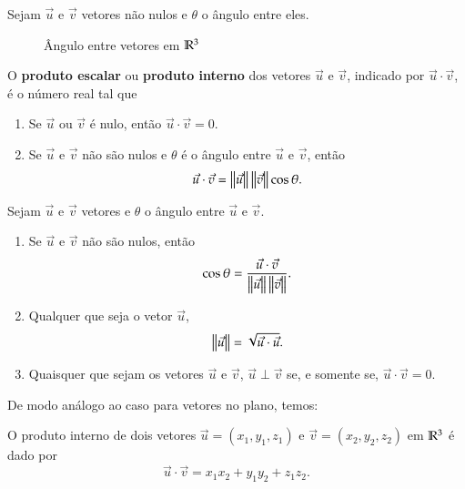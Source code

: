 Sejam $\vec{u}$ e $\vec{v}$ vetores n\~ao nulos e $\theta$ o \^angulo entre eles.
\begin{figure}[!h]
  \centering
  \caption{Ângulo entre vetores em $\mathbb{R}^3$}
\end{figure}


\begin{definicao}\label{produtointerno-espaco}
  O \textbf{produto escalar} ou \textbf{produto interno} dos vetores $\vec{u}$ e $\vec{v}$, indicado por $\vec{u}\cdot\vec{v}$, \'e o n\'umero real tal que
  \begin{enumerate}
    \item Se $\vec{u}$ ou $\vec{v}$ \'e nulo, ent\~ao $\vec{u}\cdot\vec{v} = 0$.
    \item Se $\vec{u}$ e $\vec{v}$ n\~ao s\~ao nulos e $\theta$ \'e o \^angulo entre $\vec{u}$ e $\vec{v}$, ent\~ao
    \begin{align}\label{produto-interno-espaco}
      \vec{u}\cdot\vec{v} = \left\Vert{\vec{u}}\right\Vert\left\Vert{\vec{v}}\right\Vert\cos\theta.
    \end{align}
  \end{enumerate}
\end{definicao}

\begin{proposicao}
  Sejam $\vec{u}$ e $\vec{v}$ vetores e $\theta$ o \^angulo entre $\vec{u}$ e $\vec{v}$.
  \begin{enumerate}
    \item Se $\vec{u}$ e $\vec{v}$ n\~ao s\~ao nulos, ent\~ao
    \[
      \cos\theta = \dfrac{\vec{u}\cdot\vec{v}}{\left\Vert{\vec{u}}\right\Vert\left\Vert{\vec{v}}\right\Vert}.
    \]
    \item Qualquer que seja o vetor $\vec{u}$,
    \[
      \left\Vert{\vec{u}}\right\Vert = \sqrt{\vec{u}\cdot\vec{u}}.
    \]
    \item Quaisquer que sejam os vetores $\vec{u}$ e $\vec{v}$, $\vec{u}\perp\vec{v}$ se, e somente se, $\vec{u}\cdot\vec{v} = 0$.
    \end{enumerate}
\end{proposicao}
De modo an\'alogo ao caso para vetores no plano, temos:
\begin{teorema}
  O produto interno de dois vetores $\vec{u} = (x_1, y_1,z_1)$ e $\vec{v} = (x_2, y_2,z_2)$ em $\mathbb{R}^3$ \'e dado por
  \[
    \vec{u}\cdot\vec{v} = x_1x_2 + y_1y_2 + z_1z_2.
  \]
\end{teorema}

